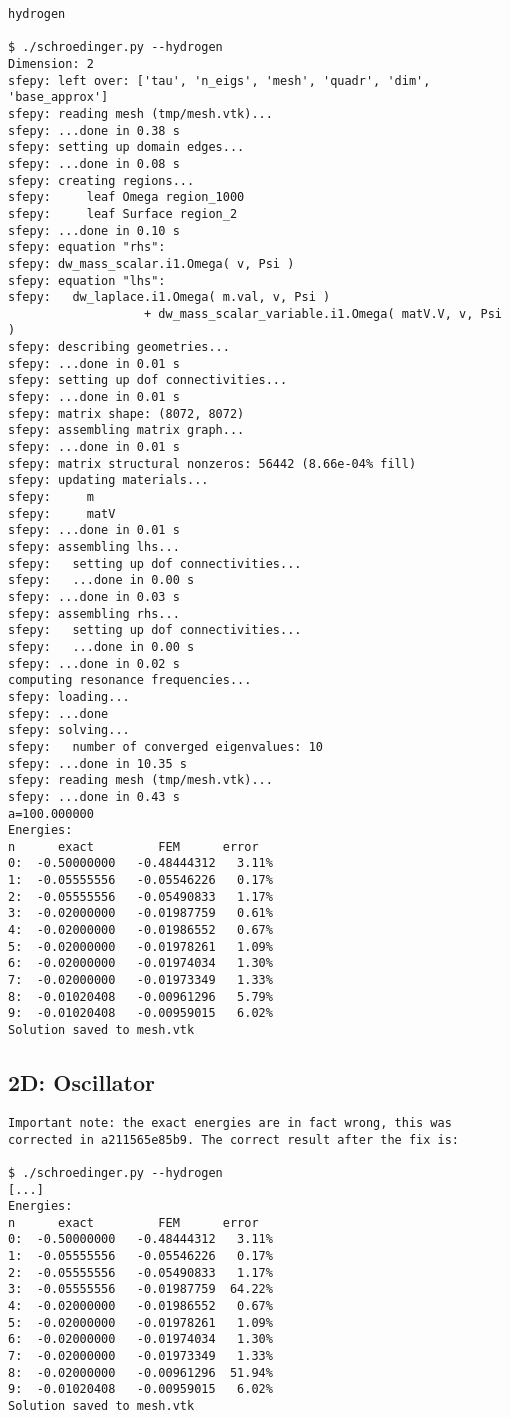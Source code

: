\begin{lstlisting}
hydrogen

$ ./schroedinger.py --hydrogen
Dimension: 2
sfepy: left over: ['tau', 'n_eigs', 'mesh', 'quadr', 'dim', 'base_approx']
sfepy: reading mesh (tmp/mesh.vtk)...
sfepy: ...done in 0.38 s
sfepy: setting up domain edges...
sfepy: ...done in 0.08 s
sfepy: creating regions...
sfepy:     leaf Omega region_1000
sfepy:     leaf Surface region_2
sfepy: ...done in 0.10 s
sfepy: equation "rhs":
sfepy: dw_mass_scalar.i1.Omega( v, Psi )
sfepy: equation "lhs":
sfepy:   dw_laplace.i1.Omega( m.val, v, Psi )
                   + dw_mass_scalar_variable.i1.Omega( matV.V, v, Psi )
sfepy: describing geometries...
sfepy: ...done in 0.01 s
sfepy: setting up dof connectivities...
sfepy: ...done in 0.01 s
sfepy: matrix shape: (8072, 8072)
sfepy: assembling matrix graph...
sfepy: ...done in 0.01 s
sfepy: matrix structural nonzeros: 56442 (8.66e-04% fill)
sfepy: updating materials...
sfepy:     m
sfepy:     matV
sfepy: ...done in 0.01 s
sfepy: assembling lhs...
sfepy:   setting up dof connectivities...
sfepy:   ...done in 0.00 s
sfepy: ...done in 0.03 s
sfepy: assembling rhs...
sfepy:   setting up dof connectivities...
sfepy:   ...done in 0.00 s
sfepy: ...done in 0.02 s
computing resonance frequencies...
sfepy: loading...
sfepy: ...done
sfepy: solving...
sfepy:   number of converged eigenvalues: 10
sfepy: ...done in 10.35 s
sfepy: reading mesh (tmp/mesh.vtk)...
sfepy: ...done in 0.43 s
a=100.000000
Energies:
n      exact         FEM      error
0:  -0.50000000   -0.48444312   3.11%
1:  -0.05555556   -0.05546226   0.17%
2:  -0.05555556   -0.05490833   1.17%
3:  -0.02000000   -0.01987759   0.61%
4:  -0.02000000   -0.01986552   0.67%
5:  -0.02000000   -0.01978261   1.09%
6:  -0.02000000   -0.01974034   1.30%
7:  -0.02000000   -0.01973349   1.33%
8:  -0.01020408   -0.00961296   5.79%
9:  -0.01020408   -0.00959015   6.02%
Solution saved to mesh.vtk

\end{lstlisting}

\subsection{2D: Oscillator}

\begin{lstlisting}
Important note: the exact energies are in fact wrong, this was corrected in a211565e85b9. The correct result after the fix is:

$ ./schroedinger.py --hydrogen
[...]
Energies:
n      exact         FEM      error
0:  -0.50000000   -0.48444312   3.11%
1:  -0.05555556   -0.05546226   0.17%
2:  -0.05555556   -0.05490833   1.17%
3:  -0.05555556   -0.01987759  64.22%
4:  -0.02000000   -0.01986552   0.67%
5:  -0.02000000   -0.01978261   1.09%
6:  -0.02000000   -0.01974034   1.30%
7:  -0.02000000   -0.01973349   1.33%
8:  -0.02000000   -0.00961296  51.94%
9:  -0.01020408   -0.00959015   6.02%
Solution saved to mesh.vtk

\end{lstlisting}

